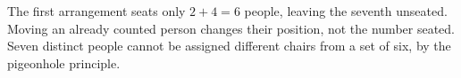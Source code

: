 The first arrangement seats only $2+4=6$ people, leaving the seventh unseated. Moving an already counted person changes their position, not the number seated. Seven distinct people cannot be assigned different chairs from a set of six, by the pigeonhole principle.
